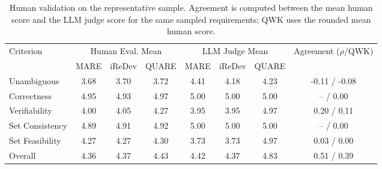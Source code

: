 \begin{table}[t]
\centering
\caption{Human validation on the representative sample. Agreement is computed between the mean human score and the LLM judge score for the same sampled requirements; QWK uses the rounded mean human score.}
\label{tab:human-validation}
\scriptsize
\begin{tabular}{lccc ccc c}
\toprule
\multirow{2}{*}{Criterion} & \multicolumn{3}{c}{Human Eval. Mean} & \multicolumn{3}{c}{LLM Judge Mean} & \multirow{2}{*}{Agreement ($\rho$/QWK)} \\
\cmidrule(lr){2-4}\cmidrule(lr){5-7}
 & MARE & iReDev & QUARE & MARE & iReDev & QUARE & \\
\midrule
Unambiguous & 3.68 & 3.70 & 3.72 & 4.41 & 4.18 & 4.23 & -0.11 / -0.08 \\
Correctness & 4.95 & 4.93 & 4.97 & 5.00 & 5.00 & 5.00 & -- / 0.00 \\
Verifiability & 4.00 & 4.05 & 4.27 & 3.95 & 3.95 & 4.97 & 0.20 / 0.11 \\
Set Consistency & 4.89 & 4.91 & 4.92 & 5.00 & 5.00 & 5.00 & -- / 0.00 \\
Set Feasibility & 4.27 & 4.27 & 4.30 & 3.73 & 3.73 & 4.97 & 0.03 / 0.00 \\
\midrule
Overall & 4.36 & 4.37 & 4.43 & 4.42 & 4.37 & 4.83 & 0.51 / 0.39 \\
\bottomrule
\end{tabular}
\end{table}
